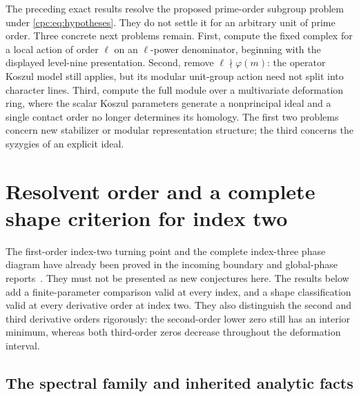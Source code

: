 \documentclass[11pt,a4paper]{article}
\numberwithin{equation}{section}
\theoremstyle{definition}
\theoremstyle{remark}
\begin{document}
The preceding exact results resolve the proposed prime-order subgroup
problem under \eqref{cpc:eq:hypotheses}. They do not settle it for an
arbitrary unit of prime order. Three concrete next problems remain.
First, compute the fixed complex for a local action of order $\ell$
on an $\ell$-power denominator, beginning with the displayed level-nine
presentation. Second, remove $\ell\nmid\varphi(m)$: the operator
Koszul model still applies, but its modular unit-group action need
not split into character lines. Third, compute the full module over
a multivariate deformation ring, where the scalar Koszul parameters
generate a nonprincipal ideal and a single contact order no longer
determines its homology. The first two problems concern new
stabilizer or modular representation structure; the third concerns
the syzygies of an explicit ideal.



\section{Resolvent order and a complete shape criterion for index two}
\label{lershape:sec:main}

The first-order index-two turning point and the complete index-three
phase diagram have already been proved in the incoming boundary and
global-phase reports~\cite{lershape:Boundary,lershape:Globalphase}.
They must not be presented as new conjectures here.
The results below add a finite-parameter comparison valid at every index,
and a shape classification valid at every derivative order at index two.
They also distinguish the second and third derivative orders rigorously:
the second-order lower zero still has an interior minimum, whereas both
third-order zeros decrease throughout the deformation interval.

\subsection{The spectral family and inherited analytic facts}
\end{document}

